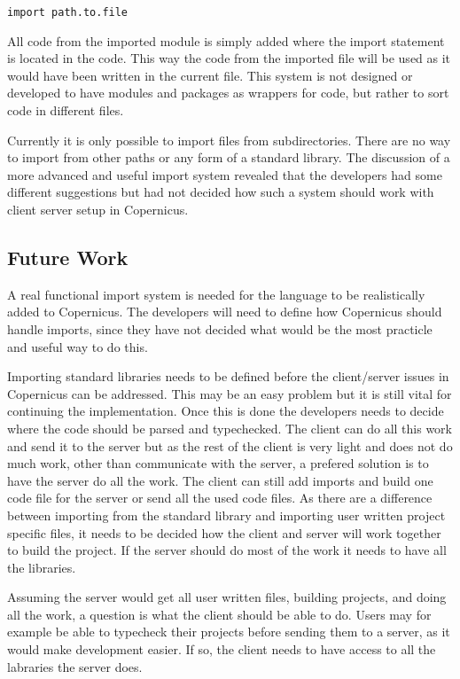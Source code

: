 \begin{verbatim}
import path.to.file
\end{verbatim}

All code from the imported module is simply added where the import
statement is located in the code. This way the code from the imported
file will be used as it would have been written in the current
file. This system is not designed or developed to have modules and
packages as wrappers for code, but rather to sort code in different
files. 

Currently it is only possible to import files from
subdirectories. There are no way to import from other paths or any
form of a standard library. The discussion of a more advanced and
useful import system revealed that the developers had some different
suggestions but had not decided how such a system should work with
client server setup in Copernicus.

\subsection{Future Work}

A real functional import system is needed for the language to be
realistically added to Copernicus. The developers will need to define
how Copernicus should handle imports, since they have not decided what
would be the most practicle and useful way to do this.

Importing standard libraries needs to be defined before the
client/server issues in Copernicus can be addressed. This may be an
easy problem but it is still vital for continuing the
implementation. Once this is done the developers needs to decide where
the code should be parsed and typechecked. The client can do all this
work and send it to the server but as the rest of the client is very
light and does not do much work, other than communicate with the
server, a prefered solution is to have the server do all the work. The
client can still add imports and build one code file for the server or
send all the used code files. As there are a difference between
importing from the standard library and importing user written project
specific files, it needs to be decided how the client and server will
work together to build the project. If the server should do most of
the work it needs to have all the libraries.

Assuming the server would get all user written files, building
projects, and doing all the work, a question is what the client should
be able to do. Users may for example be able to typecheck their
projects before sending them to a server, as it would make development
easier. If so, the client needs to have access to all the labraries
the server does.

